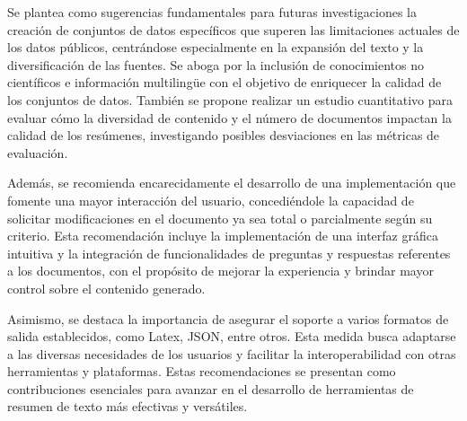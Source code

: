 \begin{recomendations}
    Se plantea como sugerencias fundamentales para futuras investigaciones la creación de conjuntos de datos específicos que superen las limitaciones actuales de los datos públicos, centrándose especialmente en la expansión del texto y la diversificación de las fuentes. Se aboga por la inclusión de conocimientos no científicos e información multilingüe con el objetivo de enriquecer la calidad de los conjuntos de datos. También se propone realizar un estudio cuantitativo para evaluar cómo la diversidad de contenido y el número de documentos impactan la calidad de los resúmenes, investigando posibles desviaciones en las métricas de evaluación.

    Además, se recomienda encarecidamente el desarrollo de una implementación que fomente una mayor interacción del usuario, concediéndole la capacidad de solicitar modificaciones en el documento ya sea total o parcialmente según su criterio. Esta recomendación incluye la implementación de una interfaz gráfica intuitiva y la integración de funcionalidades de preguntas y respuestas referentes a los documentos, con el propósito de mejorar la experiencia y brindar mayor control sobre el contenido generado.
    
    Asimismo, se destaca la importancia de asegurar el soporte a varios formatos de salida establecidos, como Latex, JSON, entre otros. Esta medida busca adaptarse a las diversas necesidades de los usuarios y facilitar la interoperabilidad con otras herramientas y plataformas. Estas recomendaciones se presentan como contribuciones esenciales para avanzar en el desarrollo de herramientas de resumen de texto más efectivas y versátiles.
\end{recomendations}
